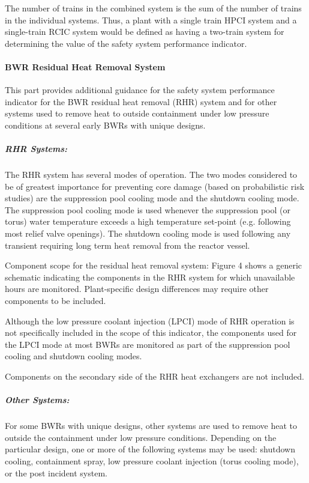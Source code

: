 The number of trains in the combined system is the sum of the number
of trains in the individual systems. Thus, a plant with a single train
HPCI system and a single-train RCIC system would be defined as having
a two-train system for determining the value of the safety system
performance indicator.


\paragraph{BWR Residual Heat Removal System}

This part provides additional guidance for the safety system
performance indicator for the BWR residual heat removal (RHR) system
and for other systems used to remove heat to outside containment under
low pressure conditions at several early BWRs with unique designs.

\subparagraph{RHR Systems:}  The RHR system has several modes of
operation. The two modes considered to be of greatest importance for
preventing core damage (based on probabilistic risk studies) are the
suppression pool cooling mode and the shutdown cooling mode. The
suppression pool cooling mode is used whenever the suppression pool
(or torus) water temperature exceeds a high temperature set-point
(e.g. following most relief valve openings). The shutdown cooling mode
is used following any transient requiring long term heat removal from
the reactor vessel.

Component scope for the residual heat removal system:  Figure 4 shows
a generic schematic indicating the components in the RHR system for
which unavailable hours are monitored. Plant-specific design
differences may require other components to be included.

Although the low pressure coolant injection (LPCI) mode of RHR
operation is not specifically included in the scope of this indicator,
the components used for the LPCI mode at most BWRs are monitored as
part of the suppression pool cooling and shutdown cooling modes.

Components on the secondary side of the RHR heat exchangers are not
included.

\subparagraph{Other Systems:}  For some BWRs with unique designs,
other systems are used to remove heat to outside the containment under
low pressure conditions. Depending on the particular design, one or
more of the following systems may be used:  shutdown cooling,
containment spray, low pressure coolant injection (torus cooling
mode), or the post incident system.


